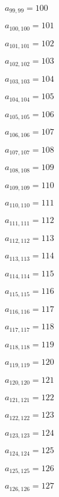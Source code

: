 \documentclass[a4paper,12pt]{article}
\begin{document}
$a _{ 99, 99 } = 100$

$a _{ 100, 100 } = 101$

$a _{ 101, 101 } = 102$

$a _{ 102, 102 } = 103$

$a _{ 103, 103 } = 104$

$a _{ 104, 104 } = 105$

$a _{ 105, 105 } = 106$

$a _{ 106, 106 } = 107$

$a _{ 107, 107 } = 108$

$a _{ 108, 108 } = 109$

$a _{ 109, 109 } = 110$

$a _{ 110, 110 } = 111$

$a _{ 111, 111 } = 112$

$a _{ 112, 112 } = 113$

$a _{ 113, 113 } = 114$

$a _{ 114, 114 } = 115$

$a _{ 115, 115 } = 116$

$a _{ 116, 116 } = 117$

$a _{ 117, 117 } = 118$

$a _{ 118, 118 } = 119$

$a _{ 119, 119 } = 120$

$a _{ 120, 120 } = 121$

$a _{ 121, 121 } = 122$

$a _{ 122, 122 } = 123$

$a _{ 123, 123 } = 124$

$a _{ 124, 124 } = 125$

$a _{ 125, 125 } = 126$

$a _{ 126, 126 } = 127$
\end{document}

